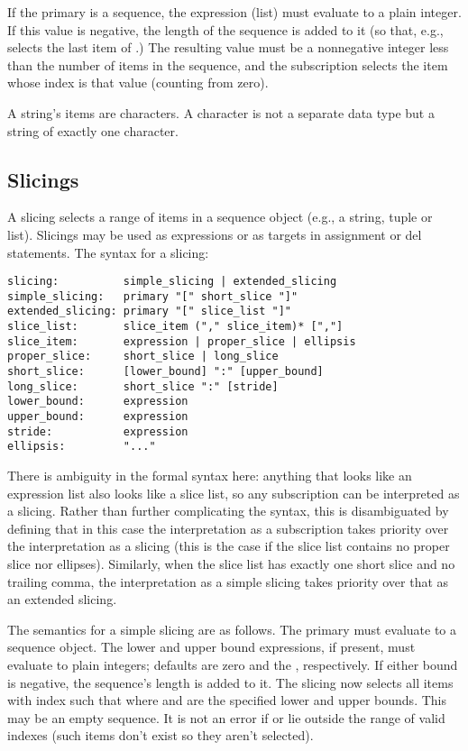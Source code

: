 If the primary is a sequence, the expression (list) must evaluate to a
plain integer.  If this value is negative, the length of the sequence
is added to it (so that, e.g.,  selects the last item of
.)  The resulting value must be a nonnegative integer less
than the number of items in the sequence, and the subscription selects
the item whose index is that value (counting from zero).

A string's items are characters.  A character is not a separate data
type but a string of exactly one character.

\subsection{Slicings\label{slicings}}

A slicing selects a range of items in a sequence object (e.g., a
string, tuple or list).  Slicings may be used as expressions or as
targets in assignment or del statements.  The syntax for a slicing:

\begin{verbatim}
slicing:          simple_slicing | extended_slicing
simple_slicing:   primary "[" short_slice "]"
extended_slicing: primary "[" slice_list "]" 
slice_list:       slice_item ("," slice_item)* [","]
slice_item:       expression | proper_slice | ellipsis
proper_slice:     short_slice | long_slice
short_slice:      [lower_bound] ":" [upper_bound]
long_slice:       short_slice ":" [stride]
lower_bound:      expression
upper_bound:      expression
stride:           expression
ellipsis:         "..."
\end{verbatim}

There is ambiguity in the formal syntax here: anything that looks like
an expression list also looks like a slice list, so any subscription
can be interpreted as a slicing.  Rather than further complicating the
syntax, this is disambiguated by defining that in this case the
interpretation as a subscription takes priority over the
interpretation as a slicing (this is the case if the slice list
contains no proper slice nor ellipses).  Similarly, when the slice
list has exactly one short slice and no trailing comma, the
interpretation as a simple slicing takes priority over that as an
extended slicing.

The semantics for a simple slicing are as follows.  The primary must
evaluate to a sequence object.  The lower and upper bound expressions,
if present, must evaluate to plain integers; defaults are zero and the
, respectively.  If either bound is negative, the
sequence's length is added to it.  The slicing now selects all items
with index  such that
 where 
and  are the specified lower and upper bounds.  This may be an
empty sequence.  It is not an error if  or  lie outside the
range of valid indexes (such items don't exist so they aren't
selected).


